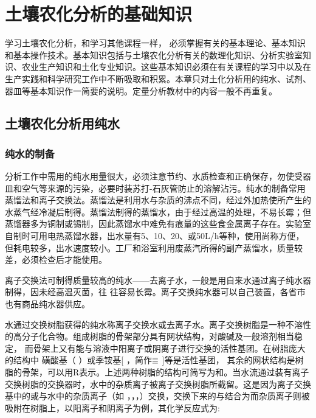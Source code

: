 \chapter{土壤农化分析的基础知识}

学习土壤农化分析，和学习其他课程一样， 必须掌握有关的基本理论、基本知识和基本操作技术。基本知识包括与土壤农化分析有关的数理化知识、分析实验室知识、农业生产知识和土化专业知识。这些基本知识必须在有关课程的学习中以及在生产实践和科学研究工作中不断吸取和积累。本章只对土化分析用的纯水、试剂、器皿等基本知识作一简要的说明。定量分析教材中的内容一般不再重复。

\section{土壤农化分析用纯水}
\subsection{纯水的制备}

分析工作中需用的纯水用量很大，必须注意节约、水质检查和正确保存，勿使受器皿和空气等来源的污染，必要时装苏打-石灰管防止的溶解沾污。纯水的制备常用蒸馏法和离子交换法。蒸馏法是利用水与杂质的沸点不同，经过外加热使所产生的水蒸气经冷凝后制得。蒸馏法制得的蒸馏水，由于经过高温的处理，不易长霉；但蒸馏器多为铜制或锡制，因此蒸馏水中难免有痕量的这些食金属离子存在。实验室自制时可用电热蒸馏水器，出水量有5、10、20、或50L/h等种，使用尚称方便，但耗电较多，出水速度较小。工厂和浴室利用废蒸汽所得的副产蒸馏水，质量较差，必须检查后才能使用。

离子交换法可制得质量较高的纯水——去离子水，一般是用自来水通过离子纯水器制得，因未经高温灭菌，往
往容易长霉。离子交换纯水器可以自己装置，各省市也有商品纯水器供应。

水通过交换树脂获得的纯水称离子交换水或去离子水。离子交换树脂是一种不溶性的高分子化合物。组成树脂的骨架部分具有网状结构，对酸碱及一般溶剂相当稳定， 而骨架上又有能与溶液中阳离子或阴离子进行交换的活性基团。在树脂庞大的结构中 磺酸基（ ）或季铵基[  ，简作$\superequiv$ ]等是活性基团， 其余的网状结构是树脂的骨架，可以用R表示。上述两种树脂的结构可简写为和。当水流通过装有离子交换树脂的交换器时，水中的杂质离子被离子交换树脂所截留。这是因为离子交换基中的或与水中的杂质离子（如 ，，，）交换，交换下来的与结合为而杂质离子则被吸附在树脂上，以阳离子和阴离子为例，其化学反应式为:

